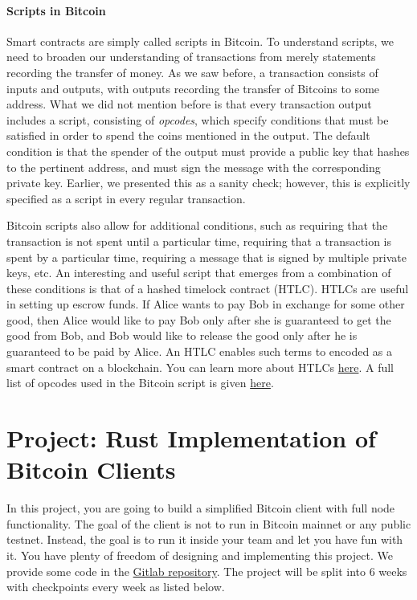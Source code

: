 \documentclass{article}
\begin{document}
\paragraph{Scripts in Bitcoin}
Smart contracts are simply called scripts in Bitcoin. To understand scripts, we need to broaden our understanding of transactions from merely statements recording the transfer of money. As we saw before, a transaction consists of inputs and outputs, with outputs recording the transfer of Bitcoins to some address. What we did not mention before is that every transaction output includes a script, consisting of \textit{opcodes}, which specify conditions that must be satisfied in order to spend the coins mentioned in the output. The default condition is that the spender of the output must provide a public key that hashes to the pertinent address, and must sign the message with the corresponding private key. Earlier, we presented this as a sanity check; however, this is explicitly specified as a script in every regular transaction.

Bitcoin scripts also allow for additional conditions, such as requiring that the transaction is not spent until a particular time, requiring that a transaction is spent by a particular time, requiring a message that is signed by multiple private keys, etc.
An interesting and useful script that emerges from a combination of these conditions is that of a hashed timelock contract (HTLC). HTLCs are useful in setting up escrow funds. If Alice wants to pay Bob in exchange for some other good, then Alice would like to pay Bob only after she is guaranteed to get the good from Bob, and Bob would like to release the good only after he is guaranteed to be paid by Alice. An HTLC enables such terms to encoded as a smart contract on a blockchain. You can learn more about HTLCs \href{https://www.investopedia.com/terms/h/hashed-timelock-contract.asp}{here}. A full list of opcodes used in the Bitcoin script is given \href{https://en.bitcoin.it/wiki/Script}{here}.

\newpage

\section*{Project: Rust Implementation of Bitcoin Clients}

In this project, you are going to build a simplified Bitcoin client with full node functionality. The goal of the client is not to run in Bitcoin mainnet or any public testnet. Instead, the goal is to run it inside your team and let you have fun with it. You have plenty of freedom of designing and implementing this project. We provide some code in the \href{https://gitlab.engr.illinois.edu/ece598pv/ece598pv-sp2021}{Gitlab repository}. The project will be split into 6 weeks with checkpoints every week as listed below.




\end{document}
